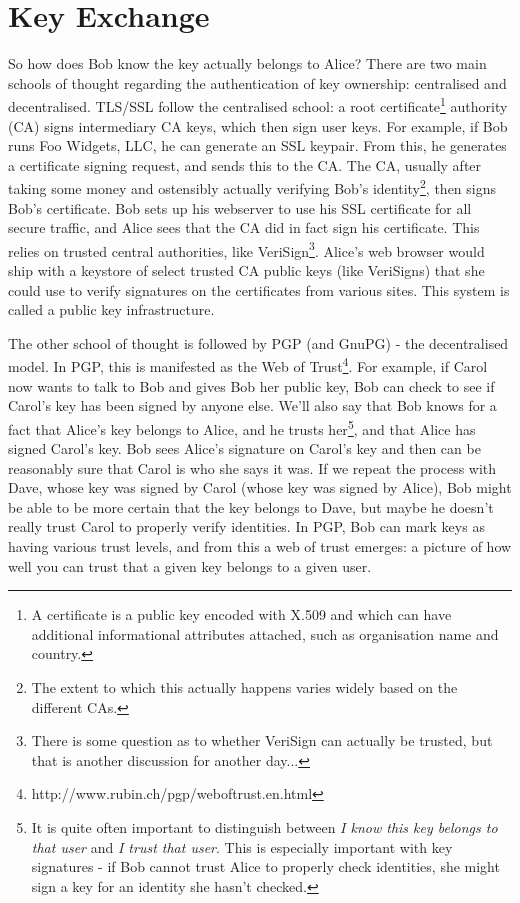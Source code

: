\documentclass[letterpaper,10pt]{article}
\begin{document}
\section{Key Exchange}
So how does Bob know the key actually belongs to Alice? There are two main
schools of thought regarding the authentication of key ownership: centralised
and decentralised. TLS/SSL follow the centralised school: a root 
certificate\footnote{A certificate is a public key encoded with X.509 and which
can have additional informational attributes attached, such as organisation
name and country.} authority (CA) signs intermediary CA keys, which then sign
user keys. For example, if Bob runs Foo Widgets, LLC, he can generate an SSL
keypair. From this, he generates a certificate signing request, and sends this
to the CA. The CA, usually after taking some money and ostensibly actually
verifying Bob's identity\footnote{The extent to which this actually happens 
varies widely based on the different CAs.}, then signs Bob's certificate. Bob
sets up his webserver to use his SSL certificate for all secure traffic, and
Alice sees that the CA did in fact sign his certificate. This relies on trusted
central authorities, like VeriSign\footnote{There is some question as to whether
VeriSign can actually be trusted, but that is another discussion for another
day...}. Alice's web browser would ship with a keystore of select trusted CA
public keys (like VeriSigns) that she could use to verify signatures on the
certificates from various sites. This system is called a public key 
infrastructure. 

The other school of thought is followed by PGP (and GnuPG) - the 
decentralised model. In PGP, this is manifested as the Web of 
Trust\footnote{http://www.rubin.ch/pgp/weboftrust.en.html}. 
For example, if Carol now wants to talk to Bob and gives Bob her public key,
Bob can check to see if Carol's key has been signed by anyone else. We'll also
say that Bob knows for a fact that Alice's key belongs to Alice, and he trusts
her\footnote{It is quite often important to distinguish between 
\textit{I know this key belongs to that user} and \textit{I trust that user}. 
This is especially important with key signatures - if Bob cannot trust Alice to
properly check identities, she might sign a key for an identity she hasn't
checked.}, and that Alice has signed Carol's key. Bob sees Alice's signature on
Carol's key and then can be reasonably sure that Carol is who she says it was.
If we repeat the process with Dave, whose key was signed by Carol (whose key
was signed by Alice), Bob might be able to be more certain that the key belongs
to Dave, but maybe he doesn't really trust Carol to properly verify identities.
In PGP, Bob can mark keys as having various trust levels, and from this a web
of trust emerges: a picture of how well you can trust that a given key belongs
to a given user.
\end{document}
